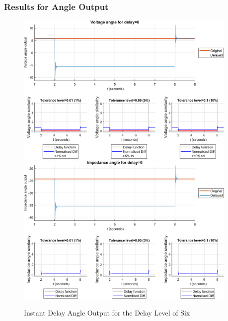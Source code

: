 \subsubsection{Results for Angle Output}


\begin{figure}
    \caption{Instant Delay Angle Output for the Delay Level of Six}
    \includegraphics[width=0.95\textwidth]{PMUsim-figures/DelayOf_6/Instant_vAngle.png}    
    \includegraphics[width=0.95\textwidth]{PMUsim-figures/DelayOf_6/Instant_iAngle.png}    
    \label{fig:PMUsim_Six_Angle}
        \begin{small}
     \end{small}
\end{figure}


